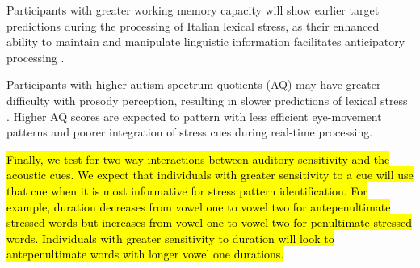 Participants with greater working memory capacity will show earlier target predictions during the processing of Italian lexical stress, as their enhanced ability to maintain and manipulate linguistic information facilitates anticipatory processing \citep{Traxler2009, Huettig2016}.

Participants with higher autism spectrum quotients (AQ) may have greater difficulty with prosody perception, resulting in slower predictions of lexical stress \citep{schelinski2020speech, grossman2023relationship}. Higher AQ scores are expected to pattern with less efficient eye-movement patterns and poorer integration of stress cues during real-time processing.

\hl{Finally, we test for two-way interactions between auditory sensitivity and the acoustic cues. We expect that individuals with greater sensitivity to a cue will use that cue when it is most informative for stress pattern identification. For example, duration decreases from vowel one to vowel two for antepenultimate stressed words but increases from vowel one to vowel two for penultimate stressed words. Individuals with greater sensitivity to duration will look to antepenultimate words with longer vowel one durations.}

